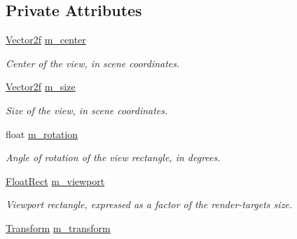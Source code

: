 \subsection*{Private Attributes}
\begin{DoxyCompactItemize}
\item 
\mbox{\label{classsf_1_1_view_a2aafc31cea5b8f9afd273df7f33198be}} 
\mbox{\hyperlink{classsf_1_1_vector2}{Vector2f}} \mbox{\hyperlink{classsf_1_1_view_a2aafc31cea5b8f9afd273df7f33198be}{m\+\_\+center}}
\begin{DoxyCompactList}\small\item\em Center of the view, in scene coordinates. \end{DoxyCompactList}\item 
\mbox{\label{classsf_1_1_view_ab7eb79d4cbfb717cfd5a4ad3c6d19dd5}} 
\mbox{\hyperlink{classsf_1_1_vector2}{Vector2f}} \mbox{\hyperlink{classsf_1_1_view_ab7eb79d4cbfb717cfd5a4ad3c6d19dd5}{m\+\_\+size}}
\begin{DoxyCompactList}\small\item\em Size of the view, in scene coordinates. \end{DoxyCompactList}\item 
\mbox{\label{classsf_1_1_view_a7f1500a1904edffffc5daa76f2f95037}} 
float \mbox{\hyperlink{classsf_1_1_view_a7f1500a1904edffffc5daa76f2f95037}{m\+\_\+rotation}}
\begin{DoxyCompactList}\small\item\em Angle of rotation of the view rectangle, in degrees. \end{DoxyCompactList}\item 
\mbox{\label{classsf_1_1_view_a2d89b9e2b7ae058c98f1f80c132ae8d6}} 
\mbox{\hyperlink{classsf_1_1_rect}{Float\+Rect}} \mbox{\hyperlink{classsf_1_1_view_a2d89b9e2b7ae058c98f1f80c132ae8d6}{m\+\_\+viewport}}
\begin{DoxyCompactList}\small\item\em Viewport rectangle, expressed as a factor of the render-\/target\textquotesingle{}s size. \end{DoxyCompactList}\item 
\mbox{\label{classsf_1_1_view_ab27082a1c1fb6b00bd44d2aa322082aa}} 
\mbox{\hyperlink{classsf_1_1_transform}{Transform}} \mbox{\hyperlink{classsf_1_1_view_ab27082a1c1fb6b00bd44d2aa322082aa}{m\+\_\+transform}}

\end{DoxyCompactItemize}

